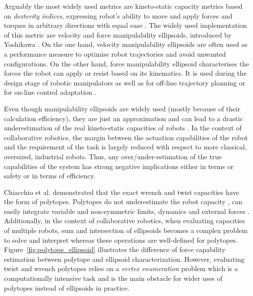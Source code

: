 Arguably the most widely used metrics are kineto-static capacity metrics based on \textit{dexterity indices}, expressing robot's ability to move and apply forces and torques in arbitrary directions with equal ease \cite{angeles_design_2016}. The widely used implementation of this metric are velocity and force manipulability ellipsoids, introduced by Yoshikawa \cite{yoshikawa_manipulability_1985}. 
On the one hand, velocity manipulability ellipsoids are often used as a performance measure to optimise robot trajectories and avoid unwanted configurations. On the other hand, force manipulability ellipsoid characterises the forces the robot can apply or resist based on its kinematics. It is used during the design stage of robotic manipulators \cite{angeles_design_2016} as well as for off-line trajectory planning \cite{kuffner_motion_2016} or for on-line control adaptation \cite{joseph2019online}.

Even though manipulability ellipsoids are widely used (mostly because of their calculation efficiency), they are just an approximation and can lead to a drastic underestimation of the real kineto-static capacities of robots \cite{merlet_jacobian_2006}. In the context of collaborative robotics, the margin between the actuation capabilities of the robot and the requirement of the task is largely reduced with respect to more classical, oversized, industrial robots. Thus, any over/under-estimation of the true capabilities of the system has strong negative implications either in terms or safety or in terms of efficiency.

Chiacchio et al.\cite{chiacchio_evaluation_1996} demonstrated that the exact wrench and twist capacities have the form of polytopes. Polytopes do not underestimate the robot capacity \cite{finotello_computation_1998}, can easily integrate variable and non-symmetric limits, dynamics and external forces \cite{merlet_jacobian_2006}. Additionally, in the context of collaborative robotics, when evaluating capacities of multiple robots, sum and intersection of ellipsoids becomes a complex problem to solve and interpret \cite{lee_dual_1989}\cite{chiacchio_task_1991}\cite{julio_frantz_analysis_2015} whereas these operations are well-defined for polytopes. Figure~\ref{fig:polytope_ellipsoid} illustrates the difference of force capability estimation between polytope and ellipsoid characterization.
However, evaluating twist and wrench polytopes relies on a \textit{vertex enumeration} problem \cite{avis_pivoting_nodate} which is a computationally intensive task and is the main obstacle for wider uses of polytopes instead of ellipsoids in practice. 

